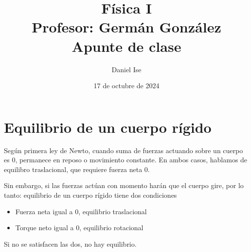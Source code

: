 \documentclass[12pt]{article}
\title{Física I\\Profesor: Germán González\\Apunte de clase}
\author{Daniel Ise}
\date{17 de octubre de 2024}
\begin{document}
\maketitle

\tableofcontents

\section{Equilibrio de un cuerpo rígido}

Según primera ley de Newto, cuando suma de fuerzas actuando sobre un cuerpo es 0,
permanece en reposo o movimiento constante.
En ambos casos, hablamos de equilibro traslacional, que requiere fuerza neta 0.

Sin embargo, si las fuerzas actúan con momento harán que el cuerpo gire,
por lo tanto: equilibrio de un cuerpo rígido tiene dos condiciones
\begin{itemize}
    \item Fuerza neta igual a 0, equilibrio traslacional
    \item Torque neto igual a 0, equilibrio rotacional
\end{itemize}

Si no se satisfacen las dos, no hay equilibrio.
\end{document}

